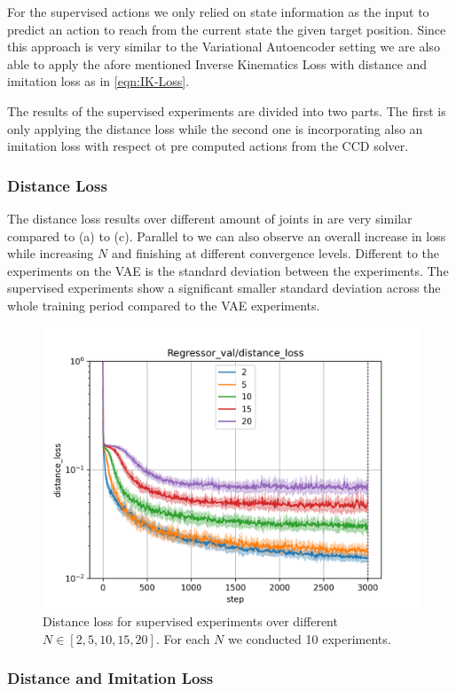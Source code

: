 For the supervised actions we only relied on state information as the input to predict an action to reach from the current state the given target position.  Since this approach is very similar to the Variational Autoencoder setting we are also able to apply the afore mentioned Inverse Kinematics Loss with distance and imitation loss as in \eqref{eqn:IK-Loss}.

The results of the supervised experiments are divided into two parts. The first is only applying the distance loss while the second one is incorporating also an imitation loss with respect ot pre computed actions from the CCD solver.

\subsubsection{Distance Loss}

The distance loss results over different amount of joints in  are very similar compared to  (a) to (c). Parallel to  we can also observe an overall increase in loss while increasing $N$ and finishing at different convergence levels. Different to the experiments on the VAE is the standard deviation between the experiments. The supervised experiments show a significant smaller standard deviation across the whole training period compared to the VAE experiments.

\begin{figure}
    \begin{center}
        \includegraphics[width=0.46 \linewidth]{figures/experiments/supervised_2_distance_loss.png}
    \end{center}
    \caption[Supervised Distance Loss]{Distance loss for supervised experiments over different $N \in [2, 5, 10, 15, 20]$. For each $N$ we conducted 10 experiments. }
    \label{fig:supervised_distance}
\end{figure}

\subsubsection{Distance and Imitation Loss}

